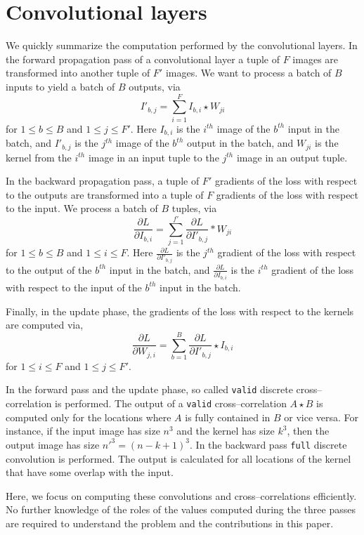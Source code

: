 \section{Convolutional layers}

  We quickly summarize the computation performed by the convolutional
  layers.  In the forward propagation pass of a convolutional layer a
  tuple of $F$ images are transformed into another tuple of $F'$
  images.  We want to process a batch of $B$ inputs to yield a batch
  of $B$ outputs, via
  \[
  I'_{b,j} = \sum_{i=1}^F I_{b,i} \star W_{ji}
  \]
  for $1 \le b \le B$ and $1 \le j \le F'$.  Here $I_{b,i}$ is the
  $i^{th}$ image of the $b^{th}$ input in the batch, and $I'_{b,j}$ is
  the $j^{th}$ image of the $b^{th}$ output in the batch, and $W_{ji}$
  is the kernel from the $i^{th}$ image in an input tuple to the
  $j^{th}$ image in an output tuple.

  In the backward propagation pass, a tuple of $F'$ gradients of the
  loss with respect to the outputs are transformed into a tuple of $F$
  gradients of the loss with respect to the input.  We process a batch
  of $B$ tuples, via
  \[
  \frac{\partial L}{\partial I_{b,i}} = \sum_{j=1}^{f'}
  \frac{\partial L}{\partial I'_{b,j}} \ast W_{ji}
  \]
  for $1 \le b \le B$ and $1 \le i \le F$.  Here $\frac{\partial
    L}{\partial I'_{b,j}}$ is the $j^{th}$ gradient of the loss with
  respect to the output of the $b^{th}$ input in the batch, and
  $\frac{\partial L}{\partial I_{b,i}}$ is the $i^{th}$ gradient of
  the loss with respect to the input of the $b^{th}$ input in the
  batch.

  Finally, in the update phase, the gradients of the loss with respect
  to the kernels are computed via,
  \[
  \frac{\partial L}{\partial W_{j,i}} = \sum_{b=1}^B
  \frac{\partial L}{\partial I'_{b,j}}  \star I_{b,i}
  \]
  for $1 \le i \le F$ and $1 \le j \le F'$.

  In the forward pass and the update phase, so called \texttt{valid}
  discrete cross--correlation is performed.  The output of a
  \texttt{valid} cross--correlation $A \star B$ is computed only for
  the locations where $A$ is fully contained in $B$ or vice versa.
  For instance, if the input image has size $n^3$ and the kernel has
  size $k^3$, then the output image has size $n'^3 = (n-k+1)^3$.  In
  the backward pass \texttt{full} discrete convolution is performed.
  The output is calculated for all locations of the kernel that have
  some overlap with the input.

  Here, we focus on computing these convolutions and
  cross--correlations efficiently.  No further knowledge of the roles
  of the values computed during the three passes are required to
  understand the problem and the contributions in this paper.

